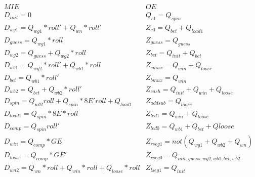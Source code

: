 \begin{enumerate}
\begin{onlysolution}
{                $$
                \begin{array}{ll}
                    MIE                        &       OE                      \\
                    D_{init}= 0                    &  Q_{c1} = Q_{spin}          \\
                    D_{wg1}= Q_{wg1}*roll'+Q_{wn}*roll'        &  Z_{c0} = Q_{bet} + Q_{load1}           \\
                    D_{guess} = Q_{wg1}*roll                   &  Z_{guess} = Q_{guess}           \\
                    D_{wg2}= Q_{guess} + Q_{wg2}*roll        &  Z_{bet}= Q_{init} + Q_{bet} \\
                    D_{wb1}= Q_{wg2}*roll'+Q_{wb1}*roll        &  Z_{cmux} = Q_{win}+Q_{loose}           \\
                    D_{bet } = Q_{wb1}*roll'            &  Z_{bmux} = Q_{win}           \\
                    D_{wb2}= Q_{bet} + Q_{wb2}*roll'        &  Z_{cash} = Q_{init} + Q_{win} + Q_{loose}    \\
                    D_{spin}= Q_{wb2}roll + Q_{spin}*8E'roll + Q_{load1}  &  Z_{addsub} = Q_{loose}     \\
                    D_{load1}= Q_{spin}*8E*roll            & Z_{led1} = Q_{win} + Q_{loose} \\
                    D_{comp} = Q_{spin}roll'            & Z_{led0} = Q_{wb1}+Q_{bet}+Q{loose}         \\
                    D_{win}= Q_{comp}*GE                & Z_{rseg1} = not (Q_{wg1}+Q_{wb2}+Q_{wn})      \\
                    D_{loose} = Q_{comp}*GE'            & Z_{rseg0} = Q_{init,guess,wg2,wb1,bet,wb2}\\
                    D_{wn2} = Q_{wn}*roll + Q_{win}*roll + Q_{loose}*roll & Z_{lseg1} = Q_{init}  \\
                \end{array} $$

            }
        \end{onlysolution}


\end{enumerate}
